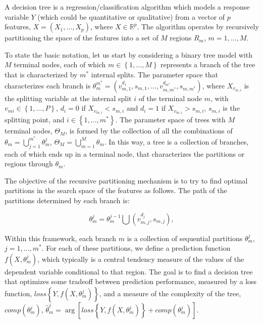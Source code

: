 \documentclass[]{elsarticle} %
\begin{document}
A decision tree is a regression/classification algorithm which models a
response variable \(Y\) (which could be quantitative or qualitative)
from a vector of \(p\) features, \(X=(X_{1},\dots,X_{p})\), where
\(X\in \mathbb{R}^{p}\). The algorithm operates by recursively
partitioning the space of the features into a set of \(M\) regions
\(R_{m}\), \(m=1,...,M\).

To state the basic notation, let us start by considering a binary tree
model with \(M\) terminal nodes, each of which
\(m\in \left\{ 1,...,M \right\}\) represents a branch of the tree that
is characterized by \(m^{\ast}\) internal splits. The parameter space
that characterizes each branch is
\(\theta_{m}^{m^{\ast }}=\left(v_{m,1}^{d_{1}},s_{m,1},...,v_{{m,m}^{\ast }}^{d_{m^{\ast }}},s_{{m,m}^{\ast}} \right)\),
where \(X_{v_{m,i}}\) is the splitting variable at the internal split
\(i\) of the terminal node \(m\), with
\(v_{mi}\in \left\{ 1,...,P \right\}\), \(d_{i}=0\) if
\(X_{v_{m,i}}<s_{m,i}\) and \(d_{i}=1\) if \(X_{v_{m,i}}>s_{m,i}\),
\(s_{m,i}\) is the splitting point, and
\(i\in \left\{ 1,...,m^{\ast } \right\}\). The parameter space of trees
with \(M\) terminal nodes, \(\Theta_{M}\), is formed by the collection
of all the combinations of
\(\theta_{m}=\bigcup\limits_{j=1}^{m^{\ast }}\theta_{m}^{j}\),
\(\Theta_{M}=\bigcup\limits_{m=1}^M \theta_{m}\). In this way, a tree is
a collection of branches, each of which ends up in a terminal node, that
characterizes the partitions or regions through \(\theta_{m}\).

The objective of the recursive partitioning mechanism is to try to find
optimal partitions in the search space of the features as follows. The
path of the partitions determined by each branch is:

\[
\theta_{m}^{j}=\theta_{m}^{j-1}\bigcup \left( v_{m,j}^{d_{j}},s_{m,j} \right) ,
\]

Within this framework, each branch \(m\) is a collection of sequential
partitions \(\theta_{m}^{j}\), \(j=1,\dots,m^{\ast }\). For each of
these partitions, we define a prediction function
\(f\left( X,\theta _{m}^{j} \right)\), which typically is a central
tendency measure of the values of the dependent variable conditional to
that region. The goal is to find a decision tree that optimizes some
tradeoff between prediction performance, measured by a loss function,
\(loss\left\{ Y,f\left( X,\theta_{m}^{j} \right) \right\}\), and a
measure of the complexity of the tree,
\(comp\left( \theta_{m}^{j} \right)\),
\(\hat{\theta}_{m}^{j}=\arg \left[ loss\left\{ Y,f\left( X,\theta_{m}^{j} \right)\right\}+comp\left( \theta_{m}^{j} \right) \right].\)
\end{document}
